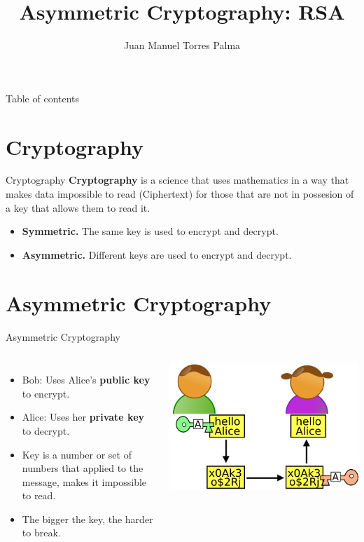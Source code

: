 \documentclass[pdf]{beamer}
\title[SC-RSA]{Asymmetric Cryptography: RSA}
\author[Juan Manuel Torres Palma]{Juan Manuel Torres Palma}
\institute[UGR]{Universidad de Granada}
\begin{document}
\begin{frame}
\titlepage
\end{frame}

\begin{frame}{Table of contents}
\tableofcontents
\end{frame}

\section{Cryptography}
\begin{frame}{Cryptography}
	\textbf{Cryptography} is a science that uses mathematics in a
	way that makes data impossible to read (Ciphertext) for those
	that are not in possesion of a key that allows them to read it.
	\vspace{1cm}
	\begin{itemize}
	\item \textbf{Symmetric.} The same key is used to encrypt and
	decrypt.
	\item \textbf{Asymmetric.} Different keys are used to encrypt and
	decrypt.
	\end{itemize}
\end{frame}

\section{Asymmetric Cryptography}
\begin{frame}{Asymmetric Cryptography}
	\begin{columns}
		\begin{itemize}
		\item Bob: Uses Alice's \textbf{public key} to encrypt.
		\item Alice: Uses her \textbf{private key} to decrypt.
		\item Key is a number or set of numbers that applied to the
		message, makes it impossible to read.
		\item The bigger the key, the harder to break.
		\end{itemize}
		\centering
		\includegraphics[scale=0.2]{img/serveimage.png}
	\end{columns}
\end{frame}
\end{document}
